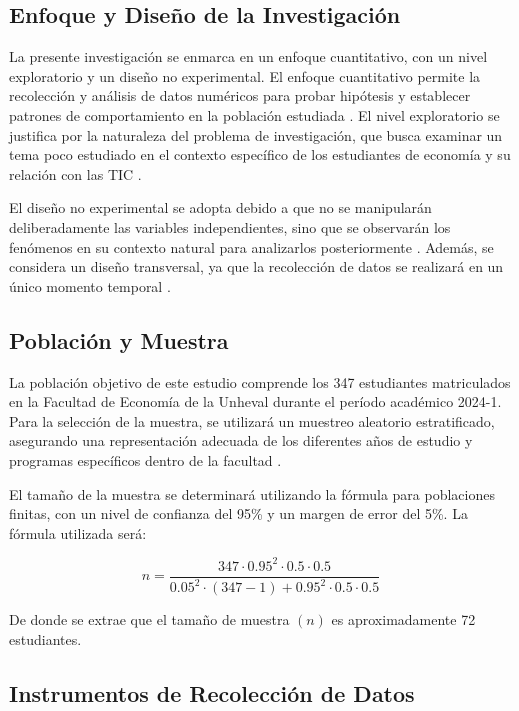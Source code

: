 \documentclass[12pt, a4paper]{article}
\begin{document}
\subsection{Enfoque y Diseño de la Investigación}

La presente investigación se enmarca en un enfoque cuantitativo, con un nivel exploratorio y un diseño no experimental. El enfoque cuantitativo permite la recolección y análisis de datos numéricos para probar hipótesis y establecer patrones de comportamiento en la población estudiada \parencite{Creswell2018}. El nivel exploratorio se justifica por la naturaleza del problema de investigación, que busca examinar un tema poco estudiado en el contexto específico de los estudiantes de economía y su relación con las TIC \parencite{Hernandez2014}.

El diseño no experimental se adopta debido a que no se manipularán deliberadamente las variables independientes, sino que se observarán los fenómenos en su contexto natural para analizarlos posteriormente \parencite{Kerlinger2002}. Además, se considera un diseño transversal, ya que la recolección de datos se realizará en un único momento temporal \parencite{Kumar2019}.

\subsection{Población y Muestra}

La población objetivo de este estudio comprende los 347 estudiantes matriculados en la Facultad de Economía de la Unheval durante el período académico 2024-1. Para la selección de la muestra, se utilizará un muestreo aleatorio estratificado, asegurando una representación adecuada de los diferentes años de estudio y programas específicos dentro de la facultad \parencite{Cochran2007}.

El tamaño de la muestra se determinará utilizando la fórmula para poblaciones finitas, con un nivel de confianza del 95\% y un margen de error del 5\%. La fórmula utilizada será:

\[n = \frac{347 \cdot 0.95^2 \cdot 0.5 \cdot 0.5}{0.05^2 \cdot (347-1) + 0.95^2 \cdot 0.5 \cdot 0.5}\]

De donde se extrae que el tamaño de muestra $(n)$ es aproximadamente 72 estudiantes.

\subsection{Instrumentos de Recolección de Datos}
\end{document}
